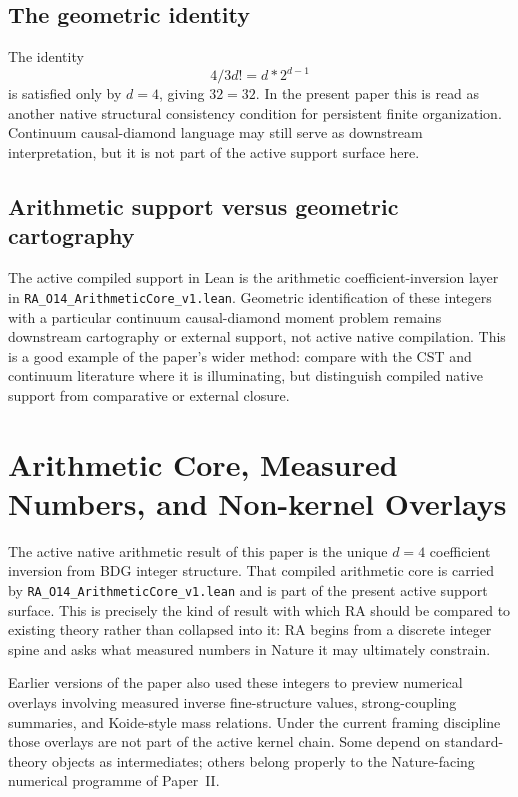 \documentclass[11pt]{article}
\def\frac#1#2{#1/#2}%
\def\cdot{*}%
\begin{document}
\subsection{The geometric identity}

The identity
\[
\frac{4}{3}d! = d\cdot 2^{d-1}
\]
is satisfied only by $d=4$, giving $32=32$. In the present paper this is read as another native structural consistency condition for persistent finite organization. Continuum causal-diamond language may still serve as downstream interpretation, but it is not part of the active support surface here.

\subsection{Arithmetic support versus geometric cartography}

The active compiled support in Lean is the arithmetic coefficient-inversion layer in \texttt{RA\_O14\_ArithmeticCore\_v1.lean}. Geometric identification of these integers with a particular continuum causal-diamond moment problem remains downstream cartography or external support, not active native compilation. This is a good example of the paper's wider method: compare with the CST and continuum literature where it is illuminating, but distinguish compiled native support from comparative or external closure.

\section{Arithmetic Core, Measured Numbers, and Non-kernel Overlays}
\label{sec:couplings}

The active native arithmetic result of this paper is the unique $d=4$ coefficient inversion from BDG integer structure. That compiled arithmetic core is carried by \texttt{RA\_O14\_ArithmeticCore\_v1.lean} and is part of the present active support surface. This is precisely the kind of result with which RA should be compared to existing theory rather than collapsed into it: RA begins from a discrete integer spine and asks what measured numbers in Nature it may ultimately constrain.

Earlier versions of the paper also used these integers to preview numerical overlays involving measured inverse fine-structure values, strong-coupling summaries, and Koide-style mass relations. Under the current framing discipline those overlays are not part of the active kernel chain. Some depend on standard-theory objects as intermediates; others belong properly to the Nature-facing numerical programme of Paper~II.
\end{document}
